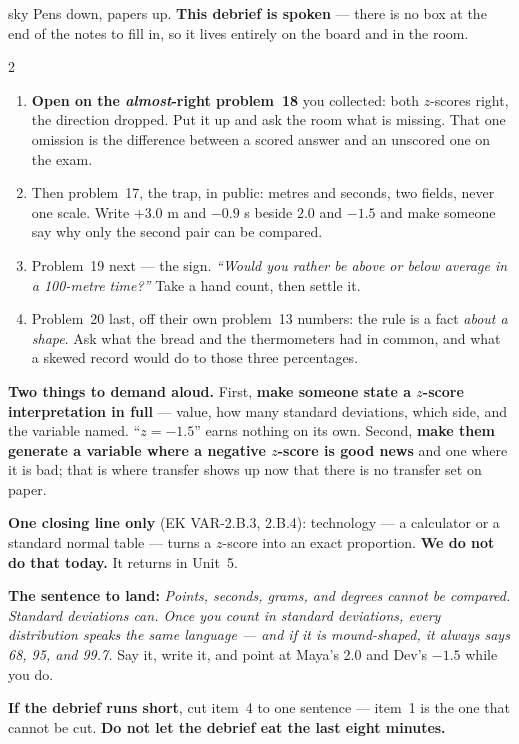 \documentclass[10pt]{article}
\begin{document}
\boxguard
\begin{skillbox}{sky}
Pens down, papers up. \textbf{This debrief is spoken} --- there is no box at the end of the
notes to fill in, so it lives entirely on the board and in the room.
\begin{multicols}{2}
\begin{enumerate}[leftmargin=1.3em, nosep, itemsep=3pt]
  \item \textbf{Open on the \emph{almost}-right problem~18} you collected: both $z$-scores
        right, the direction dropped. Put it up and ask the room what is missing. That one
        omission is the difference between a scored answer and an unscored one on the exam.
  \item Then problem~17, the trap, in public: metres and seconds, two fields, never one scale.
        Write $+3.0$ m and $-0.9$ s beside $2.0$ and $-1.5$ and make someone say why only the
        second pair can be compared.
  \item Problem~19 next --- the sign. \emph{``Would you rather be above or below average in a
        100-metre time?''} Take a hand count, then settle it.
  \item Problem~20 last, off their own problem~13 numbers: the rule is a fact \emph{about a
        shape}. Ask what the bread and the thermometers had in common, and what a skewed record
        would do to those three percentages.
\end{enumerate}
\columnbreak
\textbf{Two things to demand aloud.} First, \textbf{make someone state a $z$-score interpretation
in full} --- value, how many standard deviations, which side, and the variable named. ``$z = -1.5$''
earns nothing on its own. Second, \textbf{make them generate a variable where a negative
$z$-score is good news} and one where it is bad; that is where transfer shows up now that there
is no transfer set on paper.

\textbf{One closing line only} (EK VAR-2.B.3, 2.B.4): technology --- a calculator or a standard
normal table --- turns a $z$-score into an exact proportion. \textbf{We do not do that today.} It
returns in Unit~5.

\textbf{The sentence to land:} \emph{Points, seconds, grams, and degrees cannot be compared.
Standard deviations can. Once you count in standard deviations, every distribution speaks the
same language --- and if it is mound-shaped, it always says 68, 95, and 99.7.} Say it, write it,
and point at Maya's 2.0 and Dev's $-1.5$ while you do.

\textbf{If the debrief runs short}, cut item~4 to one sentence --- item~1 is the one that cannot
be cut. \textbf{Do not let the debrief eat the last eight minutes.}
\end{multicols}
\end{skillbox}
\end{document}
